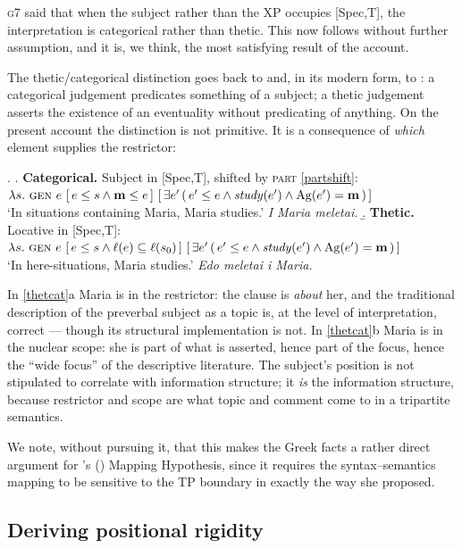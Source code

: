 \documentclass[11pt]{article}
\newcommand{\citeposs}[1]{\citeauthor{#1}'s (\citeyear{#1})}
\begin{document}
\textsc{g7} said that when the subject rather than the XP occupies [Spec,T], the interpretation is categorical rather than thetic.  This now follows without further assumption, and it is, we think, the most satisfying result of the account.

The thetic/categorical distinction goes back to \citet{kuroda:72} and, in its modern form, to \citet{ladusaw:94}: a categorical judgement predicates something of a subject; a thetic judgement asserts the existence of an eventuality without predicating of anything.  On the present account the distinction is not primitive.  It is a consequence of \emph{which} element supplies the restrictor:

\ex. \label{thetcat}
\a. \textbf{Categorical.}  Subject in [Spec,T], shifted by \textsc{part} \ref{partshift}:\\
$\lambda s.\ \textsc{gen}\ e\ [\, e \leq s \wedge \mathbf{m} \leq e\,]\ [\, \exists e'\,(\, e' \leq e \wedge \mathit{study}(e')\wedge \mathrm{Ag}(e')=\mathbf{m}\,)\,]$\\
`In situations containing Maria, Maria studies.'  \emph{I Maria meletai.}
\b. \textbf{Thetic.}  Locative in [Spec,T]:\\
$\lambda s.\ \textsc{gen}\ e\ [\, e \leq s \wedge \ell(e)\subseteq \ell(s_{0})\,]\ [\, \exists e'\,(\, e' \leq e \wedge \mathit{study}(e')\wedge \mathrm{Ag}(e')=\mathbf{m}\,)\,]$\\
`In here-situations, Maria studies.'  \emph{Edo meletai i Maria.}

\medskip
In \ref{thetcat}a Maria is in the restrictor: the clause is \emph{about} her, and the traditional description of the preverbal subject as a topic is, at the level of interpretation, correct --- though its structural implementation is not.  In \ref{thetcat}b Maria is in the nuclear scope: she is part of what is asserted, hence part of the focus, hence the ``wide focus'' of the descriptive literature.  The subject's position is not stipulated to correlate with information structure; it \emph{is} the information structure, because restrictor and scope are what topic and comment come to in a tripartite semantics.

We note, without pursuing it, that this makes the Greek facts a rather direct argument for \citeposs{diesing:92} Mapping Hypothesis, since it requires the syntax--semantics mapping to be sensitive to the TP boundary in exactly the way she proposed.

\subsection{Deriving positional rigidity}\label{mapping}
\end{document}
